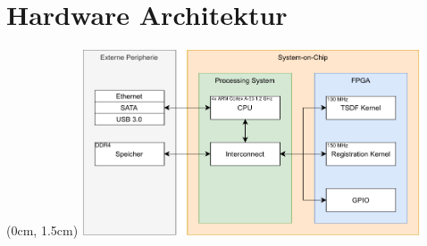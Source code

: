 \documentclass{beamer}
\begin{document}
\section{Hardware Architektur}
\begin{frame}{\secname}
\begin{center}
\begin{textblock*}{12.8cm}(0cm, 1.5cm)
\centering
\includegraphics[width=10cm]{images/Blockdiagram.pdf}
\end{textblock*}
\end{center}
\end{frame}
\end{document}
